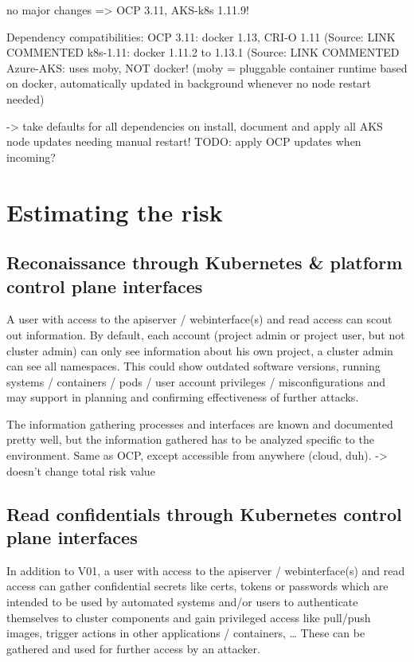 no major changes => OCP 3.11, AKS-k8s 1.11.9!

Dependency compatibilities:
OCP 3.11: docker 1.13, CRI-O 1.11 (Source: LINK COMMENTED %
k8s-1.11: docker 1.11.2 to 1.13.1  (Source: LINK COMMENTED %
Azure-AKS: uses moby, NOT docker! (moby = pluggable container runtime based on docker, automatically updated in background whenever no node restart needed)

-> take defaults for all dependencies on install, document and apply all AKS node updates needing manual restart!
TODO: apply OCP updates when incoming?


\section{Estimating the risk} \label{riskEstimate}

\subsection{Reconaissance through Kubernetes \& platform control plane interfaces}

A user with access to the apiserver / webinterface(s) and read access can scout out information.
By default, each account (project admin or project user, but not cluster admin) can only see information about his own project, a cluster admin can see all namespaces.
This could show outdated software versions, running systems / containers / pods / user account privileges / misconfigurations and may support in planning and confirming effectiveness of further attacks.

The information gathering processes and interfaces are known and documented pretty well, but the information gathered has to be analyzed specific to the environment.
Same as OCP, except accessible from anywhere (cloud, duh).
-> doesn’t change total risk value

\subsection{Read confidentials through Kubernetes control plane interfaces}
In addition to V01, a user with access to the apiserver / webinterface(s) and read access can gather confidential secrets like certs, tokens or passwords which are intended to be used by automated systems and/or users to authenticate themselves to cluster components and gain privileged access like pull/push images, trigger actions in other applications / containers, …
These can be gathered and used for further access by an attacker.

